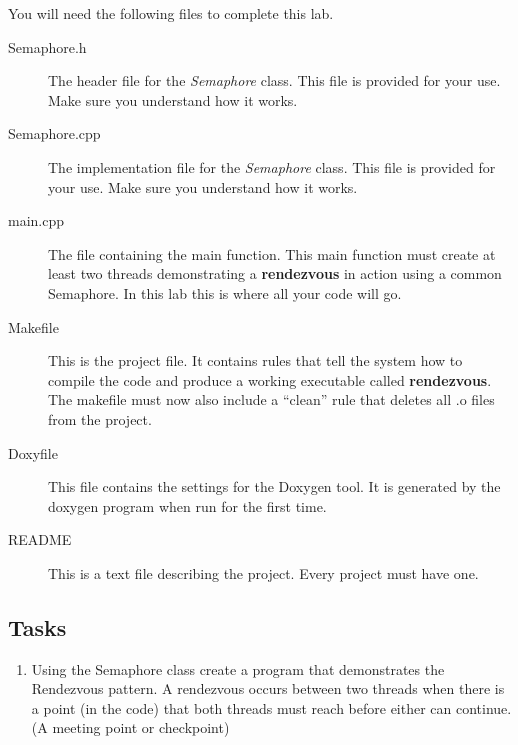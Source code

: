 \documentclass[10pt,a4paper]{article}
\begin{document}
 You will need the following files to complete this lab.
\begin{description}
\item[Semaphore.h] The header file for the \textit{Semaphore} class.  This file is provided for your use.  Make sure you understand how it works.
\item[Semaphore.cpp] The implementation file for the \textit{Semaphore} class.  This file is provided for your use.  Make sure you understand how it works.
\item[main.cpp] The file containing the main function.  This main function must create at least two threads demonstrating a \textbf{rendezvous} in action using a common Semaphore.  In this lab this is where all your code will go.
\item[Makefile] This is the project file. It contains rules that tell the system how to compile the code and produce a working executable called \textbf{rendezvous}. The makefile must now also include a “clean” rule that deletes all .o files from the project.
\item[Doxyfile] This file contains the settings for the Doxygen tool. It is generated by the doxygen program when run for the first time.
\item[README] This is a text file describing the project. Every project must have one.
\end{description}
\subsection{Tasks}
\begin{enumerate}
\item Using the Semaphore class create a program that demonstrates the Rendezvous pattern.  A rendezvous occurs between two threads when there is a point (in the code) that both threads must reach before either can continue. (A meeting point or checkpoint)
\end{enumerate}
 



 
\end{document}
